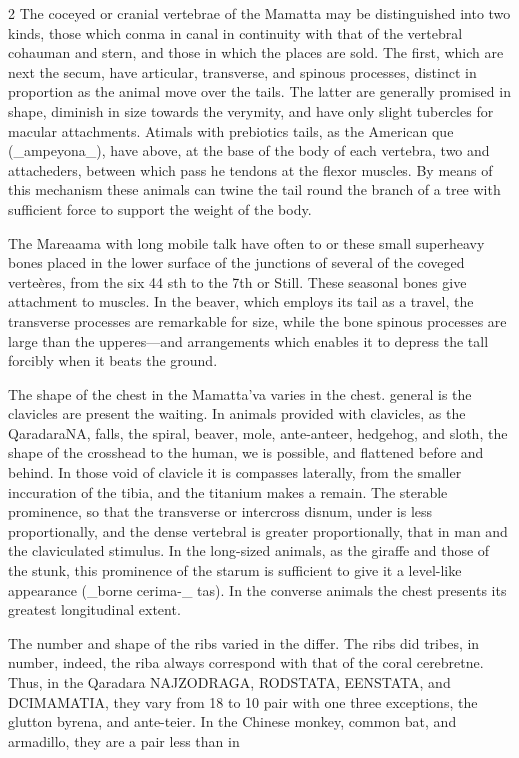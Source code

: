 \documentclass[10pt]{article}
\begin{document}
\begin{multicols}{2}
The coceyed or cranial vertebrae of the Mamatta may be distinguished into two kinds, those which conma in canal in continuity with that of the vertebral cohauman and stern, and those in which the places are sold. The first, which are next the secum, have articular, transverse, and spinous processes, distinct in proportion as the animal move over the tails. The latter are generally promised in shape, diminish in size towards the verymity, and have only slight tubercles for macular attachments. Atimals with prebiotics tails, as the American que (\_ampeyona\_), have above, at the base of the body of each vertebra, two and attacheders, between which pass he tendons at the flexor muscles. By means of this mechanism these animals can twine the tail round the branch of a tree with sufficient force to support the weight of the body.

The Mareaama with long mobile talk have often to or these small superheavy bones placed in the lower surface of the junctions of several of the coveged verteères, from the six 44 sth to the 7th or Still. These seasonal bones give attachment to muscles. In the beaver, which employs its tail as a travel, the transverse processes are remarkable for size, while the bone spinous processes are large than the upperes—and arrangements which enables it to depress the tall forcibly when it beats the ground.

The shape of the chest in the Mamatta’va varies in the chest. general is the clavicles are present the waiting. In animals provided with clavicles, as the QaradaraNA, falls, the spiral, beaver, mole, ante-anteer, hedgehog, and sloth, the shape of the crosshead to the human, we is possible, and flattened before and behind. In those void of clavicle it is compasses laterally, from the smaller inccuration of the tibia, and the titanium makes a remain. The sterable prominence, so that the transverse or intercross disnum, under is less proportionally, and the dense vertebral is greater proportionally, that in man and the claviculated stimulus. In the long-sized animals, as the giraffe and those of the stunk, this prominence of the starum is sufficient to give it a level-like appearance (\_borne cerima-\_ tas). In the converse animals the chest presents its greatest longitudinal extent.

The number and shape of the ribs varied in the differ. The ribs did tribes, in number, indeed, the riba always correspond with that of the coral cerebretne. Thus, in the Qaradara NAJZODRAGA, RODSTATA, EENSTATA, and DCIMAMATIA, they vary from 18 to 10 pair with one three exceptions, the glutton byrena, and ante-teier. In the Chinese monkey, common bat, and armadillo, they are a pair less than in

\end{multicols}
\end{document}
